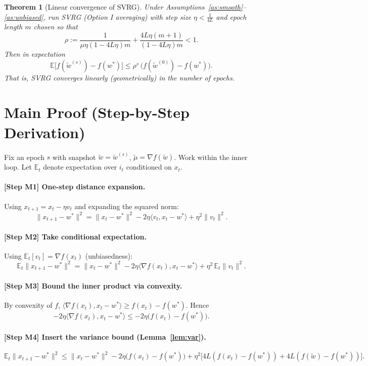 \documentclass{article}
\newtheorem{theorem}{Theorem}
\begin{document}
\begin{theorem}[Linear convergence of SVRG]\label{thm:main}
Under Assumptions~\ref{as:smooth}--\ref{as:unbiased}, run SVRG (Option I averaging) with step size $\eta < \tfrac{1}{4L}$ and epoch length $m$ chosen so that
\[
\rho := \frac{1}{\mu\eta(1-4L\eta)m} + \frac{4L\eta(m+1)}{(1-4L\eta)m} < 1.
\]
Then in expectation
\[
\mathbb{E}\big[f(\tilde{w}^{(s)}) - f(w^*)\big] \le \rho^s\,\big(f(\tilde{w}^{(0)}) - f(w^*)\big).
\]
That is, SVRG converges \emph{linearly} (geometrically) in the number of epochs.
\end{theorem}

\section*{Main Proof (Step-by-Step Derivation)}

Fix an epoch $s$ with snapshot $\tilde{w} = \tilde{w}^{(s)}$, $\tilde{\mu}=\nabla f(\tilde{w})$. Work within the inner loop. Let $\mathbb{E}_t$ denote expectation over $i_t$ conditioned on $x_t$.

\paragraph{[Step M1] One-step distance expansion.}
Using $x_{t+1} = x_t - \eta v_t$ and expanding the squared norm:
\[
\|x_{t+1} - w^*\|^2 = \|x_t - w^*\|^2 - 2\eta\langle v_t, x_t - w^*\rangle + \eta^2\|v_t\|^2.
\]

\paragraph{[Step M2] Take conditional expectation.}
Using $\mathbb{E}_t[v_t] = \nabla f(x_t)$ (unbiasedness):
\[
\mathbb{E}_t\|x_{t+1}-w^*\|^2 = \|x_t-w^*\|^2 - 2\eta\langle \nabla f(x_t), x_t-w^*\rangle + \eta^2\,\mathbb{E}_t\|v_t\|^2.
\]

\paragraph{[Step M3] Bound the inner product via convexity.}
By convexity of $f$, $\langle \nabla f(x_t), x_t - w^*\rangle \ge f(x_t) - f(w^*)$. Hence
\[
-2\eta\langle \nabla f(x_t), x_t-w^*\rangle \le -2\eta\big(f(x_t)-f(w^*)\big).
\]

\paragraph{[Step M4] Insert the variance bound (Lemma~\ref{lem:var}).}
\[
\mathbb{E}_t\|x_{t+1}-w^*\|^2 \le \|x_t-w^*\|^2 - 2\eta\big(f(x_t)-f(w^*)\big) + \eta^2\Big[4L(f(x_t)-f(w^*)) + 4L(f(\tilde{w})-f(w^*))\Big].
\]
\end{document}
